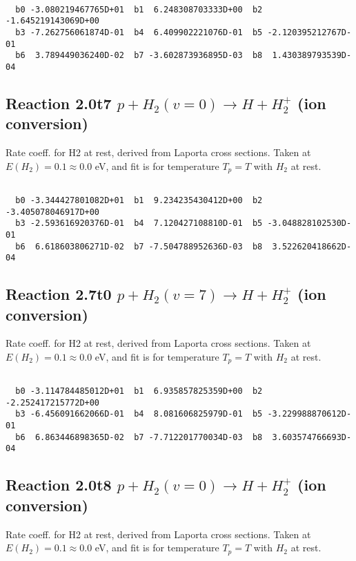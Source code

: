 \begin{small}\begin{verbatim}

  b0 -3.080219467765D+01  b1  6.248308703333D+00  b2 -1.645219143069D+00
  b3 -7.262756061874D-01  b4  6.409902221076D-01  b5 -2.120395212767D-01
  b6  3.789449036240D-02  b7 -3.602873936895D-03  b8  1.430389793539D-04

\end{verbatim}\end{small}

\newpage
\subsection{
Reaction 2.0t7
$ p + H_2(v=0) \rightarrow H + H_2^+$ (ion conversion)
}
Rate coeff. for H2 at rest, derived from Laporta cross sections.
Taken at $E(H_2) = 0.1 \approx 0.0$ eV,  and fit is for temperature $T_p=T$ with $H_2$ at rest.

\begin{small}\begin{verbatim}

  b0 -3.344427801082D+01  b1  9.234235430412D+00  b2 -3.405078046917D+00
  b3 -2.593616920376D-01  b4  7.120427108810D-01  b5 -3.048828102530D-01
  b6  6.618603806271D-02  b7 -7.504788952636D-03  b8  3.522620418662D-04

\end{verbatim}\end{small}

\newpage
\subsection{
Reaction 2.7t0
$ p + H_2(v=7) \rightarrow H + H_2^+$ (ion conversion)
}
Rate coeff. for H2 at rest, derived from Laporta cross sections.
Taken at $E(H_2) = 0.1 \approx 0.0$ eV,  and fit is for temperature $T_p=T$ with $H_2$ at rest.

\begin{small}\begin{verbatim}

  b0 -3.114784485012D+01  b1  6.935857825359D+00  b2 -2.252417215772D+00
  b3 -6.456091662066D-01  b4  8.081606825979D-01  b5 -3.229988870612D-01
  b6  6.863446898365D-02  b7 -7.712201770034D-03  b8  3.603574766693D-04

\end{verbatim}\end{small}

\newpage
\subsection{
Reaction 2.0t8
$ p + H_2(v=0) \rightarrow H + H_2^+$ (ion conversion)
}
Rate coeff. for H2 at rest, derived from Laporta cross sections.
Taken at $E(H_2) = 0.1 \approx 0.0$ eV,  and fit is for temperature $T_p=T$ with $H_2$ at rest.

